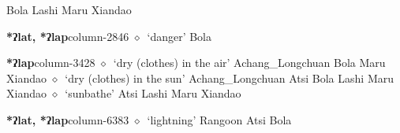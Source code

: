          Bola 
\hspace{1ex}
         Lashi 
\hspace{1ex}
         Maru 
\hspace{1ex}
         Xiandao 
  \item {\footnotesize \textbf{*ʔlat, *ʔlap}}{\tiny column-2846}
         $\diamond$~`danger'
         Bola 
  \item {\footnotesize \textbf{*ʔlap}}{\tiny column-3428}
         $\diamond$~`dry (clothes) in the air'
         Achang\_Longchuan 
\hspace{1ex}
         Bola 
\hspace{1ex}
         Maru 
\hspace{1ex}
         Xiandao 
\hspace{1ex}
         $\diamond$~`dry (clothes) in the sun'
         Achang\_Longchuan 
\hspace{1ex}
         Atsi 
\hspace{1ex}
         Bola 
\hspace{1ex}
         Lashi 
\hspace{1ex}
         Maru 
\hspace{1ex}
         Xiandao 
\hspace{1ex}
         $\diamond$~`sunbathe'
         Atsi 
\hspace{1ex}
         Lashi 
\hspace{1ex}
         Maru 
\hspace{1ex}
         Xiandao 
  \item {\footnotesize \textbf{*ʔlat, *ʔlap}}{\tiny column-6383}
         $\diamond$~`lightning'
         Rangoon 
\hspace{1ex}
         Atsi 
\hspace{1ex}
         Bola 
\hspace{1ex}
